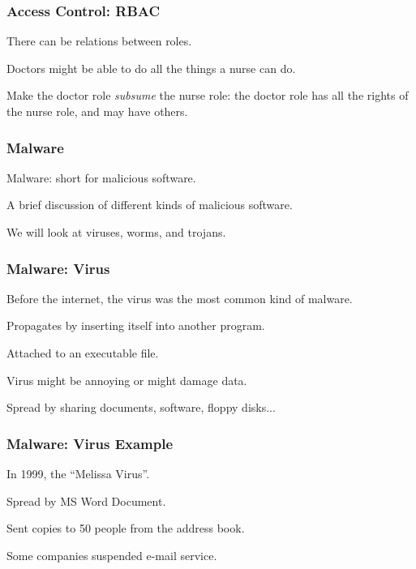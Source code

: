 \begin{frame}
\frametitle{Access Control: RBAC}
\begin{changemargin}{1cm}

There can be relations between roles.

Doctors might be able to do all the things a nurse can do. 

Make the doctor role \textit{subsume} the nurse role: the doctor role has all the rights of the nurse role, and may have others.

\end{changemargin}
\end{frame}


\begin{frame}
\frametitle{Malware}
\begin{changemargin}{1cm}

\alert{Malware}: short for malicious software.

A brief discussion of different kinds of malicious software.

We will look at viruses, worms, and trojans.

\end{changemargin}
\end{frame}


\begin{frame}
\frametitle{Malware: Virus}
\begin{changemargin}{1cm}

Before the internet, the virus was the most common kind of malware.

Propagates by inserting itself into another program.

Attached to an executable file.

Virus might be annoying or might damage data.

Spread by sharing documents, software, floppy disks...

\end{changemargin}
\end{frame}

\begin{frame}
\frametitle{Malware: Virus Example}
\begin{changemargin}{1cm}

In 1999, the ``Melissa Virus''.

Spread by MS Word Document.

Sent copies to 50 people from the address book.

Some companies suspended e-mail service.

\end{changemargin}
\end{frame}


